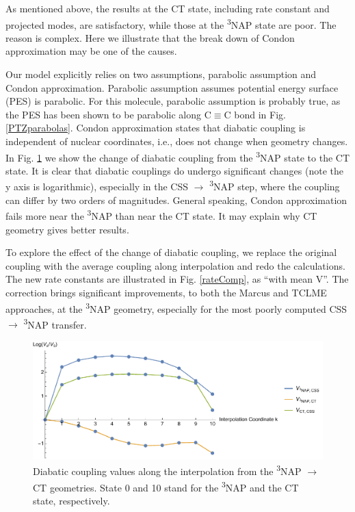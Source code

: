As mentioned above, the results at the CT state, including rate constant and projected modes, are satisfactory, while those at the \textsuperscript{3}NAP state are poor. The reason is complex. Here we illustrate that the break down of Condon approximation may be one of the causes.


Our model explicitly relies on two assumptions, parabolic assumption and Condon approximation. Parabolic assumption assumes potential energy surface (PES) is parabolic. For this molecule, parabolic assumption is probably true, as the PES has been shown to be parabolic along C$\equiv$C bond in Fig. \ref{PTZparabolas}. Condon approximation states that diabatic coupling is independent of nuclear coordinates, i.e., does not change when geometry changes. In Fig. \ref{interCondon} we show the change of diabatic coupling from the \textsuperscript{3}NAP state to the CT state. It is clear that diabatic couplings do undergo significant changes (note the y axis is logarithmic), especially in the CSS $\rightarrow$ \textsuperscript{3}NAP step, where the coupling can differ by two orders of magnitudes. General speaking, Condon approximation fails more near the \textsuperscript{3}NAP than near the CT state. It may explain why CT geometry gives better results.

To explore the effect of the change of diabatic coupling, we replace the original coupling with the average coupling along interpolation and redo the calculations. The new rate constants are illustrated in Fig. \ref{rateComp}, as ``with mean V''. The correction brings significant improvements, to both the Marcus and TCLME approaches, at the \textsuperscript{3}NAP geometry, especially for the most poorly computed  CSS $\rightarrow$ \textsuperscript{3}NAP transfer.

\begin{figure}[!h]
\includegraphics[width=\columnwidth]{Chapters/chap4/Images/interpolation.pdf}
\caption{Diabatic coupling values along the interpolation from the \textsuperscript{3}NAP $\rightarrow$ CT geometries. State 0 and 10 stand for the \textsuperscript{3}NAP and the CT state, respectively.\label{interCondon}}
\end{figure}


